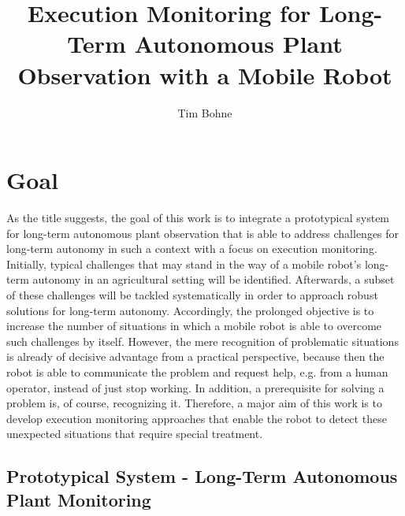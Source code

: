 \documentclass[english, master, expose, utf8]{base/thesis_KBS}
\begin{document}
\title{Execution Monitoring for Long-Term Autonomous Plant Observation with a Mobile Robot}
\author{Tim Bohne}

\generatetitle

\section{Goal}

As the title suggests, the goal of this work is to integrate a prototypical system for long-term autonomous plant observation that is able to address 
challenges for long-term autonomy in such a context with a focus on execution monitoring. Initially, typical challenges that may stand in the way of a mobile
robot's long-term autonomy in an agricultural setting will be identified. Afterwards, a subset of these challenges will be tackled systematically in order to 
approach robust solutions for long-term autonomy. Accordingly, the prolonged objective is to increase the number of situations in which a mobile robot is able to 
overcome such challenges by itself. However, the mere recognition of problematic situations is already of decisive advantage from a practical perspective, 
because then the robot is able to communicate the problem and request help, e.g. from a human operator, instead of just stop working. In addition, 
a prerequisite for solving a problem is, of course, recognizing it. Therefore, a major aim of this work is to develop execution monitoring approaches 
that enable the robot to detect these unexpected situations that require special treatment.

\subsection{Prototypical System - Long-Term Autonomous Plant Monitoring}
\label{sec:prototypical_system}
\end{document}
